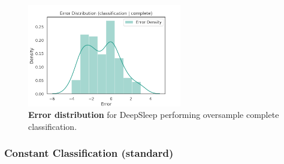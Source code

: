 \documentclass[11pt]{scrartcl}
\begin{document}
\begin{figure}[hbt]
	\centering
	\includegraphics[width=0.6\textwidth]{img/learning/original_physionet_sleepnet_classification_complete_oversample_unweighted_error_distribution.png}
	\caption{\textcolor{viridis5}{\textbf{Error distribution}} for DeepSleep performing oversample complete classification.}
	\label{fig:original_physionet_sleepnet_classification_complete_oversample_unweighted_error_distribution}
\end{figure}

\FloatBarrier




\FloatBarrier
\subsubsection{Constant Classification (standard)}
\end{document}
